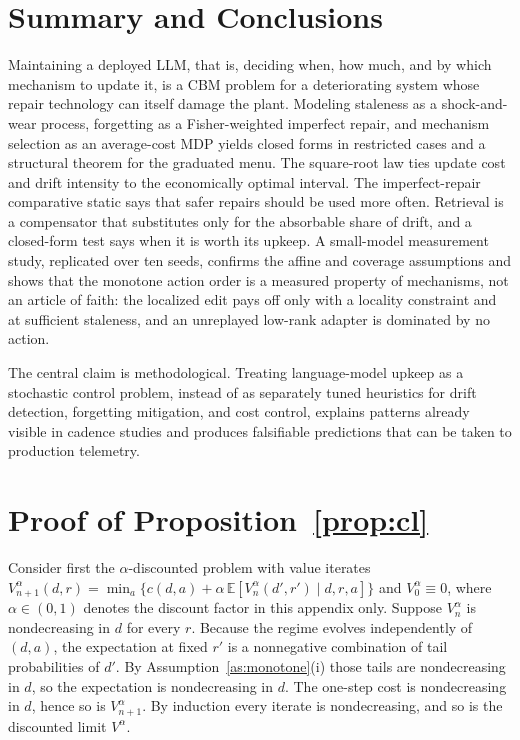 \documentclass[journal]{IEEEtran}
\newcommand{\E}{\mathbb{E}}
\begin{document}
\section{Summary and Conclusions}\label{sec:concl}
Maintaining a deployed LLM, that is, deciding when, how much, and by which mechanism to update it, is a CBM problem for a deteriorating system whose repair technology can itself damage the plant. Modeling staleness as a shock-and-wear process, forgetting as a Fisher-weighted imperfect repair, and mechanism selection as an average-cost MDP yields closed forms in restricted cases and a structural theorem for the graduated menu. The square-root law ties update cost and drift intensity to the economically optimal interval. The imperfect-repair comparative static says that safer repairs should be used more often. Retrieval is a compensator that substitutes only for the absorbable share of drift, and a closed-form test says when it is worth its upkeep. A small-model measurement study, replicated over ten seeds, confirms the affine and coverage assumptions and shows that the monotone action order is a measured property of mechanisms, not an article of faith: the localized edit pays off only with a locality constraint and at sufficient staleness, and an unreplayed low-rank adapter is dominated by no action.

The central claim is methodological. Treating language-model upkeep as a stochastic control problem, instead of as separately tuned heuristics for drift detection, forgetting mitigation, and cost control, explains patterns already visible in cadence studies and produces falsifiable predictions that can be taken to production telemetry.

\appendices
\section{Proof of Proposition~\ref{prop:cl}}
Consider first the $\alpha$-discounted problem with value iterates $V^{\alpha}_{n+1}(d,r)=\min_a\{c(d,a)+\alpha\,\E[V^{\alpha}_n(d',r')\mid d,r,a]\}$ and $V^{\alpha}_0\equiv0$, where $\alpha\in(0,1)$ denotes the discount factor in this appendix only. Suppose $V^{\alpha}_n$ is nondecreasing in $d$ for every $r$. Because the regime evolves independently of $(d,a)$, the expectation at fixed $r'$ is a nonnegative combination of tail probabilities of $d'$. By Assumption~\ref{as:monotone}(i) those tails are nondecreasing in $d$, so the expectation is nondecreasing in $d$. The one-step cost is nondecreasing in $d$, hence so is $V^{\alpha}_{n+1}$. By induction every iterate is nondecreasing, and so is the discounted limit $V^{\alpha}$.
\end{document}

